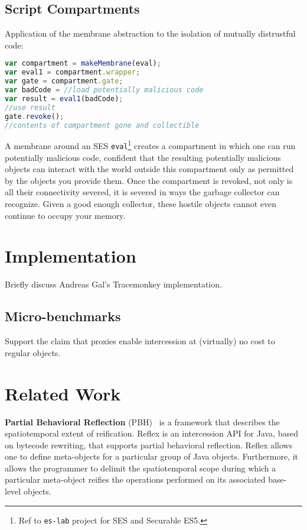 \documentclass{acm_proc_article-sp}
\begin{document}
\subsection{Script Compartments}

Application of the membrane abstraction to the isolation of mutually distrustful code:

\begin{lstlisting}[language=javascript]
var compartment = makeMembrane(eval);
var eval1 = compartment.wrapper;
var gate = compartment.gate;
var badCode = //load potentially malicious code
var result = eval1(badCode);
//use result
gate.revoke();
//contents of compartment gone and collectible
\end{lstlisting}

A membrane around an SES \texttt{eval}\footnote{Ref to \texttt{es-lab} project for SES and Securable ES5.} creates a compartment in which one can run potentially malicious code, confident that the resulting potentially malicious objects can interact with the world outside this compartment only as permitted by the objects you provide them. Once the compartment is revoked, not only is all their connectivity severed, it is severed in ways the garbage collector can recognize. Given a good enough collector, these hostile objects cannot even continue to occupy your memory.

\section{Implementation}
Briefly discuss Andreas Gal's Tracemonkey implementation.

\subsection{Micro-benchmarks}
Support the claim that proxies enable intercession at (virtually) no cost to regular objects.

\section{Related Work}

\textbf{Partial Behavioral Reflection} (PBH)~\cite{tanter} is a framework that describes the spatiotemporal extent of reification. Reflex is an intercession API for Java, based on bytecode rewriting, that supports partial behavioral reflection. Reflex allows one to define meta-objects for a particular group of Java objects. Furthermore, it allows the programmer to delimit the spatiotemporal scope during which a particular meta-object reifies the operations performed on its associated base-level objects.
\end{document}
